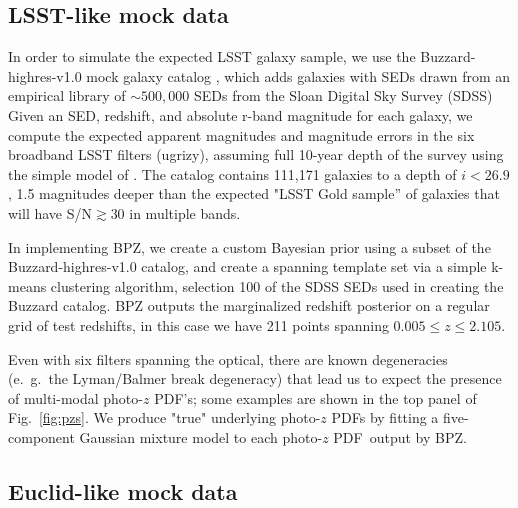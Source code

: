 \documentclass[\docopts]{\docclass}
\newcommand{\pz}{photo-$z$ PDF}
\begin{document}
\subsection{LSST-like mock data}
\label{sec:LSST}


In order to simulate the expected LSST galaxy sample, we use the 
Buzzard-highres-v1.0 mock galaxy catalog , which 
adds galaxies with SEDs drawn from an empirical library of $\sim500,000$ SEDs 
from the Sloan Digital Sky Survey  (SDSS)     Given an SED, redshift, and absolute r-band 
magnitude for each galaxy, we compute the expected apparent magnitudes and 
magnitude errors in the six broadband LSST filters (ugrizy), assuming full 
10-year depth of the survey using the simple model of 
\citet{ivezic_lsst:_2008}.  The catalog contains 111,171 galaxies to a depth of 
$i<26.9$, 1.5 magnitudes deeper than the expected "LSST Gold sample'' of 
galaxies that will have S/N$\gtrsim$30 in multiple bands.

In implementing BPZ, we create a custom Bayesian prior using a subset of the 
Buzzard-highres-v1.0 catalog, and create a spanning template set via a simple 
k-means clustering algorithm, selection 100 of the SDSS SEDs used in creating 
the Buzzard catalog.  BPZ outputs the marginalized redshift posterior on a 
regular grid of test redshifts, in this case we have 211 points spanning 
$0.005\leq z\leq2.105$.

Even with six filters spanning the optical, there are known degeneracies 
(e.~g.~the Lyman/Balmer break degeneracy) that lead us to expect the presence 
of multi-modal \pz's; some examples are shown in the top panel of 
Fig.~\ref{fig:pzs}.  We produce "true" underlying \pz s by fitting a 
five-component Gaussian mixture model to each \pz\ output by BPZ.


\subsection{Euclid-like mock data}
\label{sec:Euclid}

\end{document}

